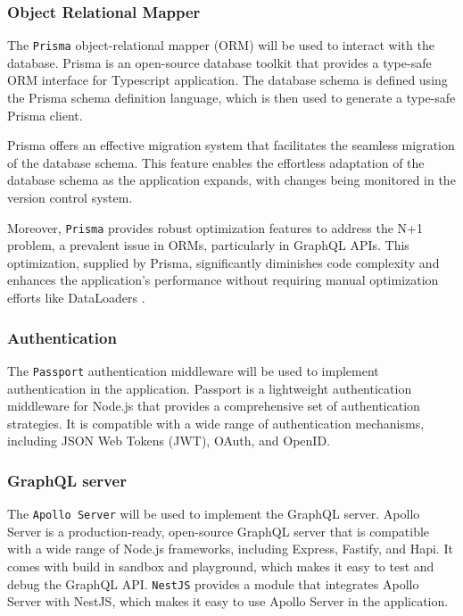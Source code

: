 \documentclass[../main.tex]{subfiles}
\begin{document}
\subsubsection{Object Relational Mapper}

The \texttt{Prisma} \cite{prisma} object-relational mapper (ORM) will be used to interact with the database.
Prisma is an open-source database toolkit that provides a type-safe ORM interface for Typescript application.
The database schema is defined using the Prisma schema definition language, which is then used to generate a type-safe Prisma client.

Prisma offers an effective migration system that facilitates the seamless migration of the database schema.
This feature enables the effortless adaptation of the database schema as the application expands, with changes being monitored in the version control system.

Moreover, \texttt{Prisma} provides robust optimization features \cite{prisma_optimization} to address the N+1 problem, a prevalent issue in ORMs, particularly in GraphQL APIs.
This optimization, supplied by Prisma, significantly diminishes code complexity and enhances the application's performance without requiring manual optimization efforts like DataLoaders \cite{medium_dataloaders_graphql}.

\subsubsection{Authentication}

The \texttt{Passport} \cite{passport} authentication middleware will be used to implement authentication in the application.
Passport is a lightweight authentication middleware for Node.js that provides a comprehensive set of authentication strategies.
It is compatible with a wide range of authentication mechanisms, including JSON Web Tokens (JWT), OAuth, and OpenID.

\subsubsection{GraphQL server}

The \texttt{Apollo Server} \cite{apollo_server} will be used to implement the GraphQL server.
Apollo Server is a production-ready, open-source GraphQL server that is compatible with a wide range of Node.js frameworks, including Express, Fastify, and Hapi.
It comes with build in sandbox and playground, which makes it easy to test and debug the GraphQL API.
\texttt{NestJS} provides a module that integrates Apollo Server with NestJS, which makes it easy to use Apollo Server in the application.
\end{document}
